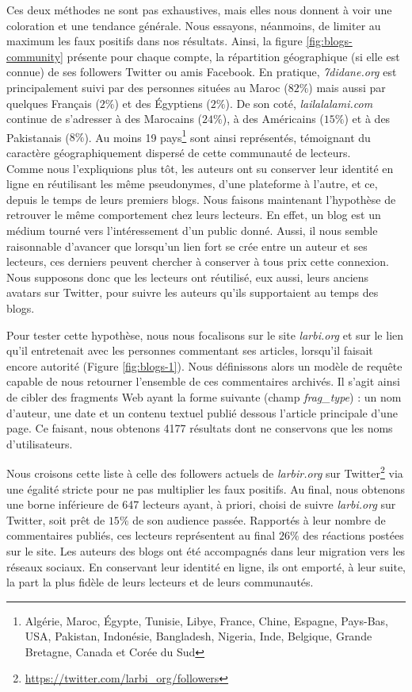 \documentclass[symmetric,justified,marginals=raggedouter]{tufte-book}
\begin{document}
Ces deux méthodes ne sont pas exhaustives, mais elles nous donnent à voir une coloration et une tendance générale. Nous essayons, néanmoins, de limiter au maximum les faux positifs dans nos résultats. Ainsi, la figure \ref{fig:blogs-community} présente pour chaque compte, la répartition géographique (si elle est connue) de ses followers Twitter ou amis Facebook. En pratique, \textit{7didane.org} est principalement suivi par des personnes situées au Maroc ($82\%$) mais aussi par quelques Français ($2\%$) et des Égyptiens ($2\%$). De son coté, \textit{lailalalami.com} continue de s'adresser à des Marocains ($24\%$), à des Américains ($15\%$) et à des Pakistanais ($8\%$). Au moins 19 pays\footnote{Algérie, Maroc, Égypte, Tunisie, Libye, France, Chine, Espagne, Pays-Bas, USA, Pakistan, Indonésie, Bangladesh, Nigeria, Inde, Belgique, Grande Bretagne, Canada et Corée du Sud} sont ainsi représentés, témoignant du caractère géographiquement dispersé de cette communauté de lecteurs. \\

\noindent Comme nous l'expliquions plus tôt, les auteurs ont su conserver leur identité en ligne en réutilisant les même pseudonymes, d'une plateforme à l'autre, et ce, depuis le temps de leurs premiers blogs. Nous faisons maintenant l'hypothèse de retrouver le même comportement chez leurs lecteurs. En effet, un blog est un médium tourné vers l'intéressement d'un public donné. Aussi, il nous semble raisonnable d'avancer que lorsqu'un lien fort se crée entre un auteur et ses lecteurs, ces derniers peuvent chercher à conserver à tous prix cette connexion. Nous supposons donc que les lecteurs ont réutilisé, eux aussi, leurs anciens avatars sur Twitter, pour suivre les auteurs qu'ils supportaient au temps des blogs.

Pour tester cette hypothèse, nous nous focalisons sur le site \textit{larbi.org} et sur le lien qu'il entretenait avec les personnes commentant ses articles, lorsqu'il faisait encore autorité (Figure \ref{fig:blogs-1}). Nous définissons alors un modèle de requête capable de nous retourner l'ensemble de ces commentaires archivés. Il s'agit ainsi de cibler des fragments Web ayant la forme suivante (champ \textit{frag\_type}) : un nom d'auteur, une date et un contenu textuel publié dessous l'article principale d'une page. Ce faisant, nous obtenons 4177 résultats dont ne conservons que les noms d'utilisateurs.

Nous croisons cette liste à celle des followers actuels de \textit{larbir.org} sur Twitter\footnote{\url{https://twitter.com/larbi_org/followers}} via une égalité stricte pour ne pas multiplier les faux positifs. Au final, nous obtenons une borne inférieure de 647 lecteurs ayant, à priori, choisi de suivre \textit{larbi.org} sur Twitter, soit prêt de $15\%$ de son audience passée. Rapportés à leur nombre de commentaires publiés, ces lecteurs représentent au final $26\%$ des réactions postées sur le site. Les auteurs des blogs ont été accompagnés dans leur migration vers les réseaux sociaux. En conservant leur identité en ligne, ils ont emporté, à leur suite, la part la plus fidèle de leurs lecteurs et de leurs communautés.
\end{document}
